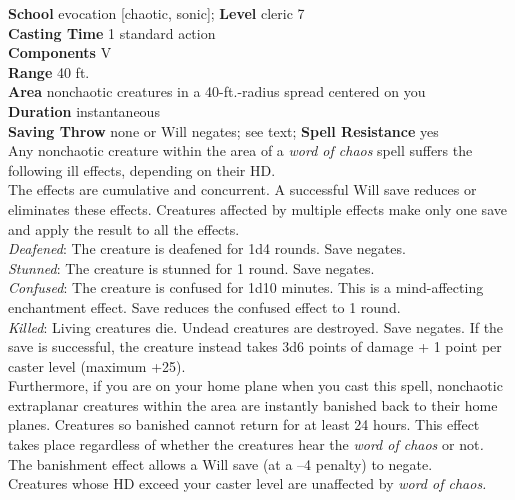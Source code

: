 \textbf{School} evocation [chaotic, sonic]; \textbf{Level} cleric 7\\
\textbf{Casting Time} 1 standard action\\
\textbf{Components} V\\
\textbf{Range} 40 ft.\\
\textbf{Area} nonchaotic creatures in a 40-ft.-radius spread centered on you\\
\textbf{Duration} instantaneous\\
\textbf{Saving Throw} none or Will negates; see text; \textbf{Spell Resistance} yes\\
Any nonchaotic creature within the area of a \textit{word of chaos }spell suffers the following ill effects, depending on their HD.\\
The effects are cumulative and concurrent. A successful Will save reduces or eliminates these effects. Creatures affected by multiple effects make only one save and apply the result to all the effects.\\
\textit{Deafened}: The creature is deafened for 1d4 rounds. Save negates.\\
\textit{Stunned}: The creature is stunned for 1 round. Save negates.\\
\textit{Confused}: The creature is confused for 1d10 minutes. This is a mind-affecting enchantment effect. Save reduces the confused effect to 1 round.\\
\textit{Killed}: Living creatures die. Undead creatures are destroyed. Save negates. If the save is successful, the creature instead takes 3d6 points of damage + 1 point per caster level (maximum +25).\\
Furthermore, if you are on your home plane when you cast this spell, nonchaotic extraplanar creatures within the area are instantly banished back to their home planes. Creatures so banished cannot return for at least 24 hours. This effect takes place regardless of whether the creatures hear the \textit{word of chaos }or not\textit{. }The banishment effect allows a Will save (at a –4 penalty) to negate.\\
Creatures whose HD exceed your caster level are unaffected by \textit{word of chaos.}\\
